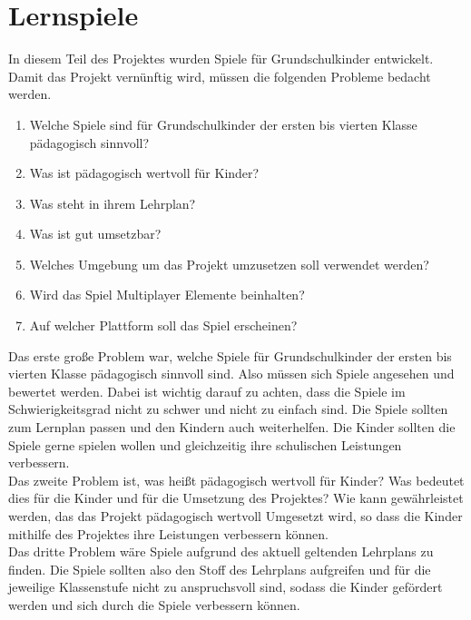 \section{Lernspiele}

In diesem Teil des Projektes wurden Spiele für Grundschulkinder entwickelt. Damit das Projekt vernünftig wird, müssen die folgenden Probleme bedacht werden.
\begin{enumerate}
    \item Welche Spiele sind für Grundschulkinder der ersten bis vierten Klasse pädagogisch sinnvoll?
    \item Was ist pädagogisch wertvoll für Kinder?
    \item Was steht in ihrem Lehrplan?
    \item Was ist gut umsetzbar?
    \item Welches Umgebung um das Projekt umzusetzen soll verwendet werden?
    \item Wird das Spiel Multiplayer Elemente beinhalten?
    \item Auf welcher Plattform soll das Spiel erscheinen?
\end{enumerate}


Das erste große Problem war, welche Spiele für Grundschulkinder der ersten bis vierten Klasse pädagogisch sinnvoll sind. Also müssen sich Spiele angesehen und bewertet werden. Dabei ist wichtig darauf zu achten, dass die Spiele im Schwierigkeitsgrad nicht zu schwer und nicht zu einfach sind. Die Spiele sollten zum Lernplan passen und den Kindern auch weiterhelfen. Die Kinder sollten die Spiele gerne spielen wollen und gleichzeitig ihre schulischen Leistungen verbessern.
\\

Das zweite Problem ist, was heißt pädagogisch wertvoll für Kinder? Was bedeutet dies für die Kinder und für die Umsetzung des Projektes? Wie kann gewährleistet werden, das das Projekt pädagogisch wertvoll Umgesetzt wird, so dass die Kinder mithilfe des Projektes ihre Leistungen verbessern können.
\\

Das dritte Problem wäre Spiele aufgrund des aktuell geltenden Lehrplans zu finden. Die Spiele sollten also den Stoff des Lehrplans aufgreifen und für die jeweilige Klassenstufe nicht zu anspruchsvoll sind, sodass die Kinder gefördert werden und sich durch die Spiele verbessern können.
\\

